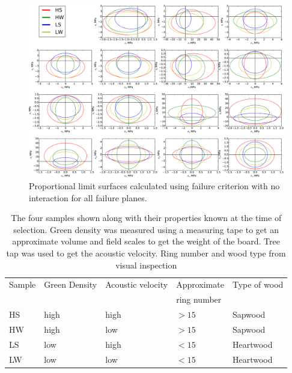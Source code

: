 \documentclass[10pt]{article}
\begin{document}
\begin{figure}[!ht]
\begin{center}
\includegraphics[width=130mm,keepaspectratio]{figs/00_tw_failure.pdf}
\caption[Proportional limit sufaces, no interaction]{\label{fig:yeild, k0} Proportional limit surfaces calculated using \citet{tsai_general_1971} failure criterion with no interaction for all failure planes.
}
\end{center}
\end{figure}

\pagebreak

\begin{table}\label{table:mill samples table}
\caption[Initial properties of samples]{The four samples shown along with their properties known at the time of selection. Green density was measured using a measuring tape to get an approximate volume and field scales to get the weight of the board. Tree tap was used to get the acoustic velocity. Ring number and wood type from visual inspection}
\begin{tabular}{l l l l l}
\hline
Sample & Green Density & Acoustic velocity & Approximate & Type of wood\\
       &               &                   & ring number &              \\
\hline
HS& high & high & \(>15\) & Sapwood\\
HW& high & low & \(>15\) & Sapwood\\
LS& low & high & \(<15\) & Heartwood\\
LW& low & low & \(<15\) & Heartwood\\
\hline
\end{tabular}
\end{table}
\end{document}
